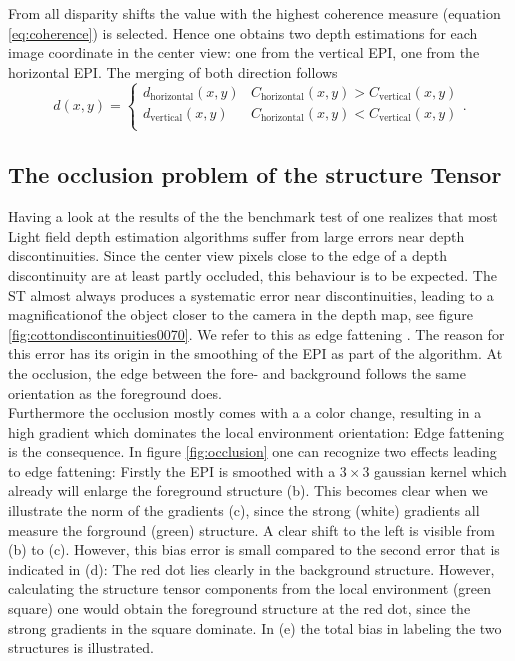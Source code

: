 \documentclass  [
  paper    = a4,
  BCOR     = 10mm,
  twoside,
  fontsize = 12pt,
  fleqn,
  toc      = bibnumbered,
  toc      = listofnumbered,
  numbers  = noendperiod,
  headings = normal,
  listof   = leveldown,
  version  = 3.03
]                                       {scrreprt}
\begin{document}
 From all disparity shifts the value with the highest coherence measure (equation \ref{eq:coherence}) is selected. Hence one obtains two depth estimations for each image coordinate in the center view: one from the vertical EPI, one from the horizontal EPI. The merging of both direction follows
 \begin{equation}\label{key}
 d(x,y) = \begin{cases} d_\text{horizontal}(x,y) & C_\text{horizontal}(x,y)>C_\text{vertical}(x,y)\\
 						d_\text{vertical}(x,y) & C_\text{horizontal}(x,y)<C_\text{vertical}(x,y)\\
 		\end{cases}.
 \end{equation} 
 \subsection{The occlusion problem of the structure Tensor}
 \label{sec:occlusionproblem}
 Having a look at the results of the the benchmark test of \cite{honauer2016benchmark} one realizes that most Light field depth estimation algorithms suffer from large errors near depth discontinuities. Since the center view pixels close to the edge of a depth discontinuity are at least partly occluded, this behaviour is to be expected. The ST almost always produces a systematic error near discontinuities, leading to a \glqq magnification\grqq of the object closer to the camera in the depth map, see figure \ref{fig:cottondiscontinuities0070}. We refer to this as \glqq edge fattening \grqq. The reason for this error has its origin in the smoothing of the EPI as part of the algorithm.  At the occlusion, the edge between the fore- and background follows the same orientation as the foreground does. \\
  Furthermore the occlusion mostly comes with a a color change, resulting in a high gradient which dominates the local environment orientation: Edge fattening is the consequence. In figure \ref{fig:occlusion} one can recognize two effects leading to edge fattening: Firstly the EPI is smoothed with a $3\times 3$ gaussian kernel which already will enlarge the foreground structure (b). This becomes clear when we illustrate the norm of the gradients (c), since the strong (white) gradients all measure the forground (green) structure. A clear shift to the left is visible from (b) to (c). However, this bias error is small compared to the second error that is indicated in (d): The red dot lies clearly in the background structure. However, calculating the structure tensor components from the local environment (green square) one would obtain the foreground structure at the red dot, since the strong gradients in the square dominate. In (e) the total bias in labeling the two structures is illustrated. 
\end{document}
